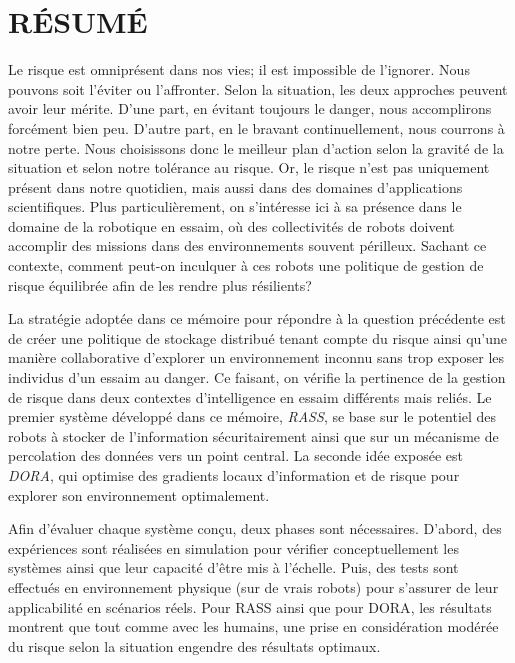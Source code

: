 %
\chapter*{RÉSUMÉ}\thispagestyle{headings}

Le risque est omniprésent dans nos vies; il est impossible de l'ignorer. Nous pouvons soit l'éviter ou l'affronter. Selon la situation, les deux approches peuvent avoir leur mérite. D'une part, en évitant toujours le danger, nous accomplirons forcément bien peu. D'autre part, en le bravant continuellement, nous courrons à notre perte. Nous choisissons donc le meilleur plan d'action selon la gravité de la situation et selon notre tolérance au risque. Or, le risque n'est pas uniquement présent dans notre quotidien, mais aussi dans des domaines d'applications scientifiques. Plus particulièrement, on s'intéresse ici à sa présence dans le domaine de la robotique en essaim, où des collectivités de robots doivent accomplir des missions dans des environnements souvent périlleux. Sachant ce contexte, comment peut-on inculquer à ces robots une politique de gestion de risque équilibrée afin de les rendre plus résilients?

La stratégie adoptée dans ce mémoire pour répondre à la question précédente est de créer une politique de stockage distribué tenant compte du risque ainsi qu'une manière collaborative d'explorer un environnement inconnu sans trop exposer les individus d'un essaim au danger. Ce faisant, on vérifie la pertinence de la gestion de risque dans deux contextes d'intelligence en essaim différents mais reliés. Le premier système développé dans ce mémoire, \textit{\ac{RASS}}, se base sur le potentiel des robots à stocker de l'information sécuritairement ainsi que sur un mécanisme de percolation des données vers un point central. La seconde idée exposée est \textit{\ac{DORA}}, qui optimise des gradients locaux d'information et de risque pour explorer son environnement optimalement.

Afin d'évaluer chaque système conçu, deux phases sont nécessaires. D'abord, des expériences sont réalisées en simulation pour vérifier conceptuellement les systèmes ainsi que leur capacité d'être mis à l'échelle. Puis, des tests sont effectués en environnement physique (sur de vrais robots) pour s'assurer de leur applicabilité en scénarios réels. Pour \ac{RASS} ainsi que pour \ac{DORA}, les résultats montrent que tout comme avec les humains, une prise en considération modérée du risque selon la situation engendre des résultats optimaux.

